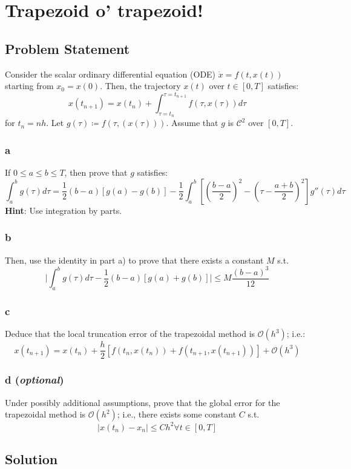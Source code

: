 \documentclass[11pt]{report}
\theoremstyle{definition}
\begin{document}
\section*{Trapezoid o' trapezoid!}
\subsection*{Problem Statement}
Consider the scalar ordinary differential equation (ODE) $\dot{x}=f(t,x(t))$
starting from $x_0=x(0)$. Then, the trajectory $x(t)$ over $t\in[0,T]$ satisfies:
\[x(t_{n+1})=x(t_n)+\int_{\tau=t_n}^{\tau=t_{n+1}}f(\tau,x(\tau))d\tau\]
for $t_n=nh$. Let $g(\tau)\coloneqq f(\tau,(x(\tau)))$. Assume that $g$ is $\mathcal{C}^2$
over $[0,T]$.

\subsubsection*{a}
If $0\leq a\leq b\leq T$, then prove that $g$ satisfies:
\[
	\int_{a}^{b} g(\tau)d\tau
	= \frac{1}{2}(b-a)[g(a)-g(b)]
	- \frac{1}{2}\int_{a}^{b}\left[
		\left(\frac{b-a}{2}\right)^2 -
		\left(\tau - \frac{a+b}{2}\right)^2
		\right]
	g''(\tau)d\tau
\]
\textbf{Hint}: Use integration by parts.
\subsubsection*{b}
Then, use the identity in part a) to prove that there exists a constant $M$ s.t.
\[
	\bigg|
	\int_{a}^{b}g(\tau)d\tau - \frac{1}{2}(b-a)[g(a)+g(b)]
	\bigg|
	\leq M\frac{(b-a)^3}{12}
\]

\subsubsection*{c}
Deduce that the local truncation error of the trapezoidal method is $\mathcal{O}(h^3)$;
i.e.:
\[
	x(t_{n+1})=x(t_n) + \frac{h}{2}[f(t_n,x(t_n))+f(t_{n+1},x(t_{n+1}))]
	+ \mathcal{O}(h^3)
\]

\subsubsection*{d (\textit{optional})}
Under possibly additional assumptions, prove that the global error for the trapezoidal
method is $\mathcal{O}(h^2)$; i.e., there exists some constant $C$ s.t.
\[|x(t_n)-x_n|\leq Ch^2\forall t\in[0, T]\]


\subsection*{Solution}
\end{document}
